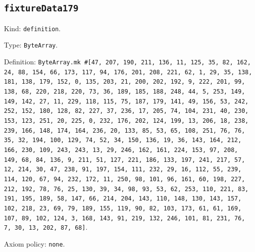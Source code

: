 \documentclass[11pt]{article}
\begin{document}
\subsection*{\texttt{fixtureData179}}
\noindent Kind: \texttt{definition}.\par
\noindent Type: \texttt{ByteArray}.\par
\noindent Definition: \texttt{ByteArray.mk \#[47, 207, 190, 211, 136, 11, 125, 35, 82, 162, 24, 88, 154, 66, 173, 117, 94, 176, 201, 208, 221, 62, 1, 29, 35, 138, 181, 138, 179, 152, 0, 135, 203, 21, 200, 202, 192, 9, 222, 201, 99, 138, 68, 220, 218, 220, 73, 36, 189, 185, 188, 248, 44, 5, 253, 149, 149, 142, 27, 11, 229, 118, 115, 75, 187, 179, 141, 49, 156, 53, 242, 252, 152, 180, 128, 82, 227, 37, 236, 17, 205, 74, 104, 231, 40, 230, 153, 123, 251, 20, 225, 0, 232, 176, 202, 124, 199, 13, 206, 18, 238, 239, 166, 148, 174, 164, 236, 20, 133, 85, 53, 65, 108, 251, 76, 76, 35, 32, 194, 100, 129, 74, 52, 34, 150, 136, 19, 36, 143, 164, 212, 166, 230, 109, 243, 243, 13, 29, 246, 162, 161, 224, 153, 97, 208, 149, 68, 84, 136, 9, 211, 51, 127, 221, 186, 133, 197, 241, 217, 57, 12, 214, 30, 47, 238, 91, 197, 154, 111, 232, 29, 16, 112, 55, 239, 114, 120, 67, 94, 232, 172, 11, 250, 98, 101, 96, 161, 60, 198, 227, 212, 192, 78, 76, 25, 130, 39, 34, 98, 93, 53, 62, 253, 110, 221, 83, 191, 195, 189, 58, 147, 66, 214, 204, 143, 110, 148, 130, 143, 157, 102, 218, 23, 69, 79, 189, 155, 119, 90, 82, 103, 173, 61, 61, 169, 107, 89, 102, 124, 3, 168, 143, 91, 219, 132, 246, 101, 81, 231, 76, 7, 30, 13, 202, 87, 68]}.\par
\noindent Axiom policy: \texttt{none}.\par
\end{document}
